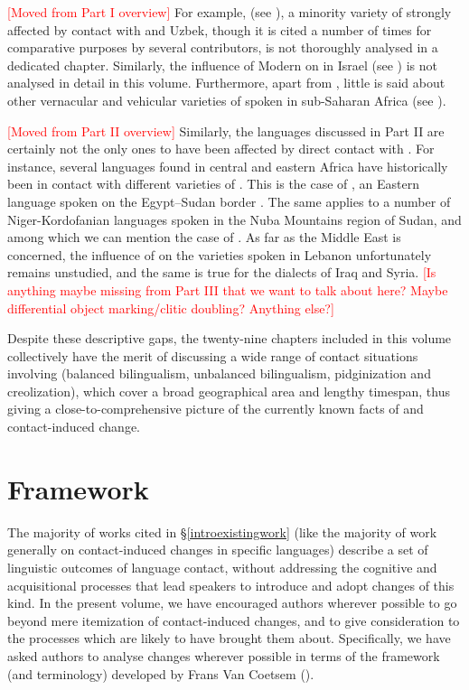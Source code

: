 \documentclass[output=paper]{langsci/langscibook}
\begin{document}
\textcolor{red}{[Moved from Part I overview]} For example,   (see \citealt{Seeger2013article}), a minority variety of  strongly affected by contact with  and Uzbek, though it is cited a number of times for {comparative} purposes by several contributors, is not thoroughly analysed in a dedicated chapter. Similarly, the influence of Modern  on   in Israel (see \citealt{Horesh2015}) is not analysed in detail in this volume. Furthermore, apart from  , little is said about other vernacular and vehicular varieties of  spoken in sub-Saharan Africa (see \citealt{Lafkioui2013book}).

\textcolor{red}{[Moved from Part II overview]} Similarly, the languages discussed in Part II are certainly not the only ones to have been affected by direct contact with . For instance, several  languages found in central and eastern Africa have historically been in contact with different varieties of . This is the case of , an Eastern  language spoken on the Egypt--Sudan border \citep{Rouchdy1980}. The same applies to a number of Niger-Kordofanian languages spoken in the Nuba Mountains region of Sudan, and among which we can mention the case of  \citep{Quint2018}. As far as the Middle East is concerned, the influence of  on the  varieties spoken in Lebanon unfortunately remains unstudied, and the same is true for the  dialects of Iraq and Syria. \textcolor{red}{[Is anything maybe missing from Part III that we want to talk about here? Maybe {differential object marking}/{clitic doubling}? Anything else?]}


Despite these descriptive gaps, the twenty-nine chapters included in this volume collectively have the merit of discussing a wide range of contact situations involving  (balanced {bilingualism}, unbalanced {bilingualism}, pidginization and creolization), which cover a broad geographical area and lengthy timespan, thus giving a close-to-comprehensive picture of the currently known facts of  and contact-induced change.

\section{Framework}\label{introvc}
The majority of works cited in §\ref{introexistingwork} (like the majority of work generally on contact-induced changes in specific languages) describe a set of linguistic outcomes of language contact, without addressing the cognitive and acquisitional processes that lead speakers to introduce and adopt changes of this kind. In the present volume, we have encouraged authors wherever possible to go beyond mere itemization of contact-induced changes, and to give consideration to the processes which are likely to have brought them about. Specifically, we have asked authors to analyse changes wherever possible in terms of the framework (and terminology) developed by Frans Van Coetsem (\citeyear{VanCoetsem1988,VanCoetsem2000}).
\end{document}
